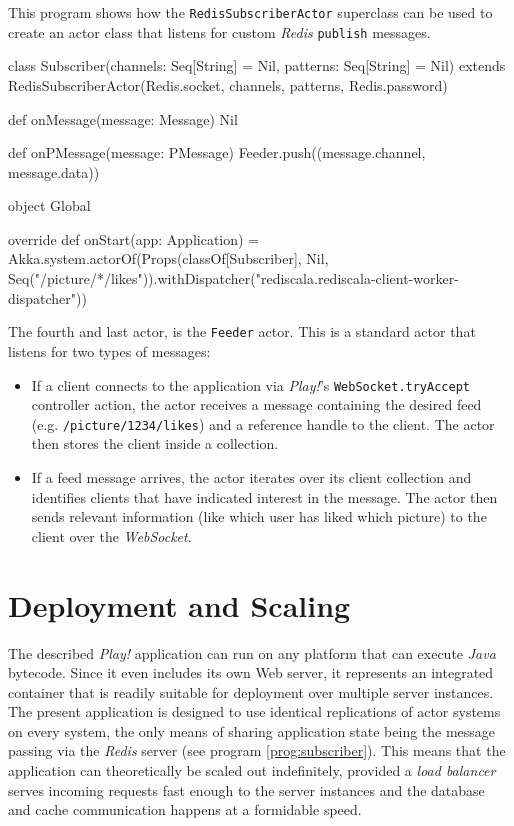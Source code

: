\begin{program}
  \caption{This program shows how the \texttt{RedisSubscriberActor} superclass can be used to create an actor class that listens for custom \textit{Redis} \texttt{publish} messages.}
  \label{prog:subscriber}
  \begin{JavaCode}
class Subscriber(channels: Seq[String] = Nil, patterns: Seq[String] = Nil) extends RedisSubscriberActor(Redis.socket, channels, patterns, Redis.password) { 
 
    def onMessage(message: Message) {
        Nil
    }

    def onPMessage(message: PMessage) {
        Feeder.push((message.channel, message.data))
    }

}

object Global {

    override def onStart(app: Application) = { 
        Akka.system.actorOf(Props(classOf[Subscriber], Nil, Seq("/picture/*/likes")).withDispatcher("rediscala.rediscala-client-worker-dispatcher"))
    }

}
  \end{JavaCode}
\end{program}

The fourth and last actor, is the \texttt{Feeder} actor. This is a standard actor that listens for two types of messages: 
\begin{itemize}
  \item{If a client connects to the application via \textit{Play!}'s \texttt{WebSocket.tryAccept} controller action, the actor receives a message containing the desired feed (e.g. \texttt{/picture/1234/likes}) and a reference handle to the client. The actor then stores the client inside a collection.}
  \item{If a feed message arrives, the actor iterates over its client collection and identifies clients that have indicated interest in the message. The actor then sends relevant information (like which user has liked which picture) to the client over the \textit{WebSocket}.}
\end{itemize}

\section{Deployment and Scaling}
The described \textit{Play!} application can run on any platform that can execute \textit{Java} bytecode. Since it even includes its own Web server, it represents an integrated container that is readily suitable for deployment over multiple server instances. The present application is designed to use identical replications of actor systems on every system, the only means of sharing application state being the message passing via the \textit{Redis} server (see program \ref{prog:subscriber}). This means that the application can theoretically be scaled out indefinitely, provided a \textit{load balancer} serves incoming requests fast enough to the server instances and the database and cache communication happens at a formidable speed.

